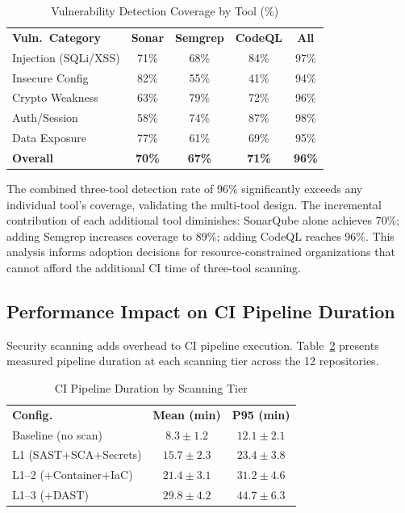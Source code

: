 \documentclass[journal]{IEEEtran}
\begin{document}
\begin{table}[h]
\centering
\caption{Vulnerability Detection Coverage by Tool (\%)}
\label{tab:coverage}
\scriptsize
\begin{tabular}{@{}lcccc@{}}
\rowcolor{TableHeader}\color{white}\textbf{Vuln.~Category} & \color{white}\textbf{Sonar} & \color{white}\textbf{Semgrep} & \color{white}\textbf{CodeQL} & \color{white}\textbf{All} \\
\rowcolor{TableAlt}Injection (SQLi/XSS) & 71\% & 68\% & 84\% & 97\% \\
\rowcolor{white}Insecure Config & 82\% & 55\% & 41\% & 94\% \\
\rowcolor{TableAlt}Crypto Weakness & 63\% & 79\% & 72\% & 96\% \\
\rowcolor{white}Auth/Session & 58\% & 74\% & 87\% & 98\% \\
\rowcolor{TableAlt}Data Exposure & 77\% & 61\% & 69\% & 95\% \\
\rowcolor{white}\textbf{Overall} & \textbf{70\%} & \textbf{67\%} & \textbf{71\%} & \textbf{96\%} \\
\end{tabular}
\end{table}

The combined three-tool detection rate of 96\% significantly exceeds any individual tool's coverage, validating the multi-tool design. The incremental contribution of each additional tool diminishes: SonarQube alone achieves 70\%; adding Semgrep increases coverage to 89\%; adding CodeQL reaches 96\%. This analysis informs adoption decisions for resource-constrained organizations that cannot afford the additional CI time of three-tool scanning.

\subsection{Performance Impact on CI Pipeline Duration}

Security scanning adds overhead to CI pipeline execution. Table~\ref{tab:perf_scan} presents measured pipeline duration at each scanning tier across the 12 repositories.

\begin{table}[h]
\centering
\caption{CI Pipeline Duration by Scanning Tier}
\label{tab:perf_scan}
\scriptsize
\begin{tabular}{@{}lcc@{}}
\rowcolor{TableHeader}\color{white}\textbf{Config.} & \color{white}\textbf{Mean (min)} & \color{white}\textbf{P95 (min)} \\
\rowcolor{TableAlt}Baseline (no scan) & $8.3 \pm 1.2$ & $12.1 \pm 2.1$ \\
\rowcolor{white}L1 (SAST+SCA+Secrets) & $15.7 \pm 2.3$ & $23.4 \pm 3.8$ \\
\rowcolor{TableAlt}L1--2 (+Container+IaC) & $21.4 \pm 3.1$ & $31.2 \pm 4.6$ \\
\rowcolor{white}L1--3 (+DAST) & $29.8 \pm 4.2$ & $44.7 \pm 6.3$ \\
\end{tabular}
\end{table}
\end{document}

